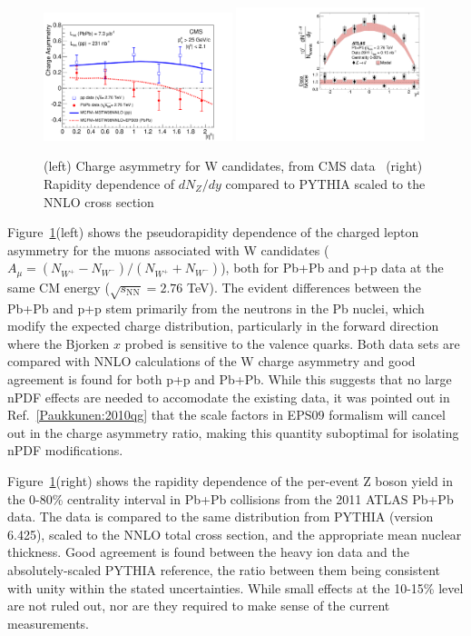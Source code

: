 \begin{figure}[!htb]
\begin{center}
\includegraphics[width=0.49\textwidth]{electroweak_figs/Fig3.pdf}
\includegraphics[width=0.49\textwidth]{electroweak_figs/fig_02.pdf}
\caption[]{(left) Charge asymmetry for W candidates, from CMS data~\cite{Chatrchyan:2012nt} (right) Rapidity dependence of $dN_{Z}/dy$ compared to PYTHIA scaled to the NNLO cross section~\cite{Aad:2012ew}}
\label{fig:pas:zw_eta}
\end{center}
\end{figure}
Figure~\ref{fig:pas:zw_eta}(left) shows the pseudorapidity dependence of the charged lepton asymmetry for the muons associated with 
W candidates ($A_\mu = (N_{W^+}-N_{W^-})/(N_{W^+}+N_{W^-})$), both for Pb+Pb and p+p data at the same CM energy
($\sqrt{s_\mathrm{NN}}=2.76$ TeV).  The evident differences between the Pb+Pb and p+p stem primarily from the neutrons in the
Pb nuclei, which modify the expected charge distribution, particularly in the forward direction where the Bjorken $x$ probed
is sensitive to the valence quarks.
Both data sets are compared with NNLO calculations of the W charge asymmetry and good agreement is found for both p+p and Pb+Pb.
While this suggests that no large nPDF effects are needed to accomodate the existing data, it was pointed out in Ref.~\ref{Paukkunen:2010qg}
that the scale factors in EPS09 formalism will cancel out in the charge asymmetry ratio, making this quantity suboptimal for 
isolating nPDF modifications.

Figure~\ref{fig:pas:zw_eta}(right) shows the rapidity dependence of the per-event 
Z boson yield in the 0-80\% centrality interval in Pb+Pb collisions
from the 2011 ATLAS Pb+Pb data.
The data is compared to the same distribution from PYTHIA (version 6.425), scaled to the NNLO total cross section, 
and the appropriate mean nuclear thickness.
Good agreement is found between the heavy ion data and the absolutely-scaled PYTHIA reference, the ratio between them being consistent 
with unity within the stated uncertainties.  While small effects at the 10-15\% level are not ruled out, nor are they required to 
make sense of the current measurements.

